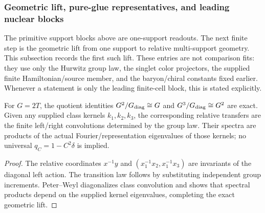 \documentclass[12pt,a4paper]{article}
\begin{document}
\subsubsection{Geometric lift, pure-glue representatives, and leading nuclear blocks}
\label{p11:subsec:geometric-lift-glue-nuclear-blocks}

The primitive support blocks above are one-support readouts.  The next finite step is the geometric lift from one support to relative multi-support geometry.  This subsection records the first such lift.  These entries are not comparison fits: they use only the Hurwitz group law, the singlet color projectors, the supplied finite Hamiltonian/source member, and the baryon/chiral constants fixed earlier.  Whenever a statement is only the leading finite-cell block, this is stated explicitly.

\begin{theorem}
\label{p11:thm:hurwitz-relative-support-lift}

For \(G=2T\), the quotient identities \(G^2/G_{\rm diag}\cong G\) and \(G^3/G_{\rm diag}\cong G^2\) are exact.  Given any supplied class kernels \(k_1,k_2,k_3\), the corresponding relative transfers are the finite left/right convolutions determined by the group law.  Their spectra are products of the actual Fourier/representation eigenvalues of those kernels; no universal \(q_C=1-C^2\delta\) is implied.
\label{p11:eq:two-support-relative-coordinate}
\label{p11:eq:relative-two-support-transfer}
\label{p11:eq:equal-support-relative-eigenvalues}
\label{p11:eq:three-support-relative-coordinate}
\label{p11:eq:three-support-relative-transfer}
\end{theorem}
\begin{proof}

The relative coordinates \(x^{-1}y\) and \((x_1^{-1}x_2,x_1^{-1}x_3)\) are invariants of the diagonal left action.  The transition law follows by substituting independent group increments.  Peter--Weyl diagonalizes class convolution and shows that spectral products depend on the supplied kernel eigenvalues, completing the exact geometric lift.
\end{proof}
\end{document}

